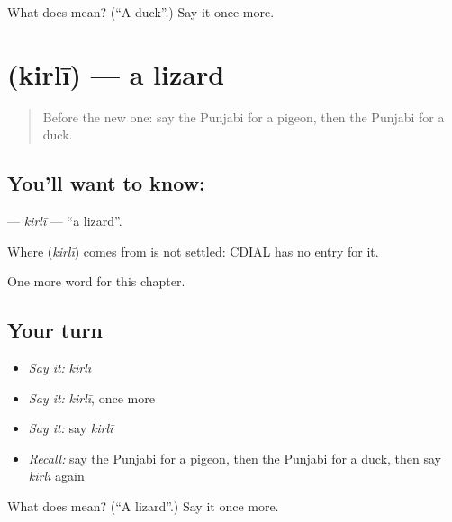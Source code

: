 \begin{tcolorbox}[breakable,colback=teal!4,colframe=teal!35!black,title={Before you move on}]
What does  mean? (\textquotedblleft{}A duck\textquotedblright{}.) Say it once more.
\end{tcolorbox}
\section[\texorpdfstring{\pa{ਕਿਰਲੀ} (kirlī)}{ਕਿਰਲੀ (kirlī)}]{ (kirlī) — a lizard}

\label{lesson:PA-C131-kirli}



\begin{quote}
Before the new one: say the Punjabi for a pigeon, then the Punjabi for a duck.
\end{quote}

\subsection*{You'll want to know: }
\textbf{} — \emph{kirlī} — \textquotedblleft{}a lizard\textquotedblright{}.

\begin{cousinweb}
Where \textbf{} (\emph{kirlī}) comes from is not settled: CDIAL has no entry for it.
\end{cousinweb}

\begin{grammarlens}[title={What you've built}]
One more word for this chapter.
\end{grammarlens}

\subsection*{Your turn}
\begin{itemize}
\raggedright
  \item \emph{Say it:} \emph{kirlī}
  \item \emph{Say it:} \emph{kirlī}, once more
  \item \emph{Say it:} say \emph{kirlī}
  \item \emph{Recall:} say the Punjabi for a pigeon, then the Punjabi for a duck, then say \emph{kirlī} again
\end{itemize}

\begin{tcolorbox}[breakable,colback=teal!4,colframe=teal!35!black,title={Before you move on}]
What does  mean? (\textquotedblleft{}A lizard\textquotedblright{}.) Say it once more.
\end{tcolorbox}
